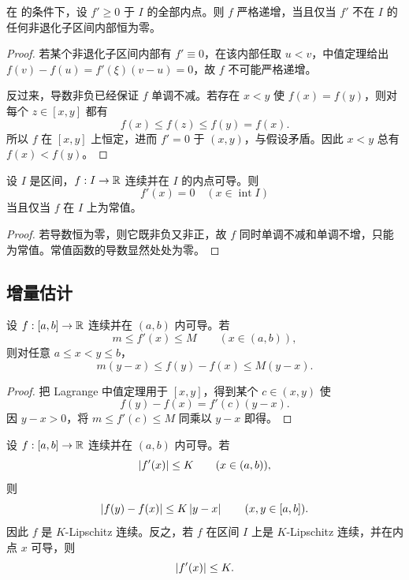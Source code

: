 \begin{proposition}[非负导数与严格递增]
\label{prop:nonnegative-derivative-strictness}
在  的条件下，设 \(f'\ge0\) 于 \(I\) 的全部内点。则 \(f\) 严格递增，当且仅当 \(f'\) 不在 \(I\) 的任何非退化子区间内部恒为零。
\end{proposition}

\begin{proof}
若某个非退化子区间内部有 \(f'\equiv0\)，在该内部任取 \(u<v\)，中值定理给出 \(f(v)-f(u)=f'(\xi)(v-u)=0\)，故 \(f\) 不可能严格递增。

反过来，导数非负已经保证 \(f\) 单调不减。若存在 \(x<y\) 使 \(f(x)=f(y)\)，则对每个 \(z\in[x,y]\) 都有
\[
 f(x)\le f(z)\le f(y)=f(x).
\]
所以 \(f\) 在 \([x,y]\) 上恒定，进而 \(f'=0\) 于 \((x,y)\)，与假设矛盾。因此 \(x<y\) 总有 \(f(x)<f(y)\)。
\end{proof}

\begin{corollary}[零导数判据]
\label{cor:zero-derivative-constant}
设 \(I\) 是区间，\(f:I\to\mathbb{R}\) 连续并在 \(I\) 的内点可导。则
\[
 f'(x)=0\quad(x\in\operatorname{int}I)
\]
当且仅当 \(f\) 在 \(I\) 上为常值。
\end{corollary}

\begin{proof}
若导数恒为零，则它既非负又非正，故 \(f\) 同时单调不减和单调不增，只能为常值。常值函数的导数显然处处为零。
\end{proof}

\subsection{增量估计}

\begin{theorem}[导数上下界与增量]
\label{thm:derivative-bounds-increments}
设 \(f:[a,b]\to\mathbb{R}\) 连续并在 \((a,b)\) 内可导。若
\[
 m\le f'(x)\le M\qquad(x\in(a,b)),
\]
则对任意 \(a\le x<y\le b\)，
\[
 m(y-x)\le f(y)-f(x)\le M(y-x).
\]
\end{theorem}

\begin{proof}
把 Lagrange 中值定理用于 \([x,y]\)，得到某个 \(c\in(x,y)\) 使
\[
 f(y)-f(x)=f'(c)(y-x).
\]
因 \(y-x>0\)，将 \(m\le f'(c)\le M\) 同乘以 \(y-x\) 即得。
\end{proof}

\begin{corollary}
\label{cor:bounded-derivative-lipschitz}
设 \(f:[a,b]\to\mathbb{R}\) 连续并在 \((a,b)\) 内可导。若
\[
 \left|f'(x)\right|\le K\qquad(x\in(a,b)),
\]
则
\[
 \left|f(y)-f(x)\right|\le K\left|y-x\right|
\qquad(x,y\in[a,b]).
\]
因此 \(f\) 是 \(K\)-Lipschitz 连续。反之，若 \(f\) 在区间 \(I\) 上是 \(K\)-Lipschitz 连续，并在内点 \(x\) 可导，则
\[
 \left|f'(x)\right|\le K.
\]
\end{corollary}

